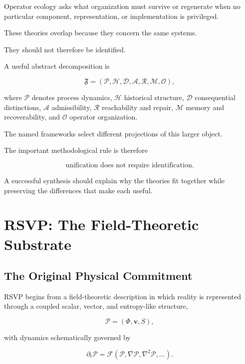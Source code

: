 \documentclass[11pt]{article}
\theoremstyle{remark}
\newcommand{\RSVP}{\textsc{RSVP}}
\begin{document}
Operator ecology asks what organization must survive or regenerate when no particular component, representation, or implementation is privileged.

These theories overlap because they concern the same systems.

They should not therefore be identified.

A useful abstract decomposition is

\begin{equation}
\mathfrak{F}
=
(
\mathcal{P},
\mathcal{H},
\mathcal{D},
\mathcal{A},
\mathcal{R},
\mathcal{M},
\mathcal{O}
),
\end{equation}

where $\mathcal{P}$ denotes process dynamics, $\mathcal{H}$ historical structure, $\mathcal{D}$ consequential distinctions, $\mathcal{A}$ admissibility, $\mathcal{R}$ reachability and repair, $\mathcal{M}$ memory and recoverability, and $\mathcal{O}$ operator organization.

The named frameworks select different projections of this larger object.

The important methodological rule is therefore

\begin{equation}
\boxed{
\text{unification does not require identification}.
}
\end{equation}

A successful synthesis should explain why the theories fit together while preserving the differences that make each useful.

\section{\RSVP{}: The Field-Theoretic Substrate}

\subsection{The Original Physical Commitment}

\RSVP{} begins from a field-theoretic description in which reality is represented through a coupled scalar, vector, and entropy-like structure,

\begin{equation}
\mathcal{P}
=
(\Phi,\mathbf{v},S),
\end{equation}

with dynamics schematically governed by

\begin{equation}
\partial_t\mathcal{P}
=
\mathcal{F}
(
\mathcal{P},
\nabla\mathcal{P},
\nabla^2\mathcal{P},
\ldots
).
\end{equation}
\end{document}
